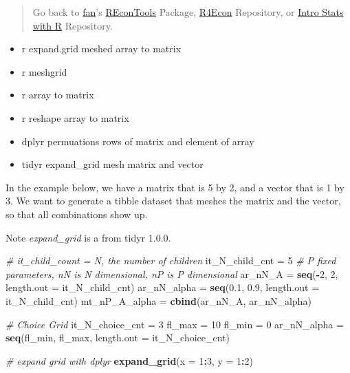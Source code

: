 \documentclass[
]{book}
\newenvironment{Shaded}{\begin{snugshade}}{\end{snugshade}}
\newcommand{\CommentTok}[1]{\textcolor[rgb]{0.56,0.35,0.01}{\textit{#1}}}
\newcommand{\DataTypeTok}[1]{\textcolor[rgb]{0.13,0.29,0.53}{#1}}
\newcommand{\DecValTok}[1]{\textcolor[rgb]{0.00,0.00,0.81}{#1}}
\newcommand{\FloatTok}[1]{\textcolor[rgb]{0.00,0.00,0.81}{#1}}
\newcommand{\KeywordTok}[1]{\textcolor[rgb]{0.13,0.29,0.53}{\textbf{#1}}}
\newcommand{\NormalTok}[1]{#1}
\newcommand{\OperatorTok}[1]{\textcolor[rgb]{0.81,0.36,0.00}{\textbf{#1}}}
\newcommand{\StringTok}[1]{\textcolor[rgb]{0.31,0.60,0.02}{#1}}
\providecommand{\tightlist}{%
  \setlength{\itemsep}{0pt}\setlength{\parskip}{0pt}}
\begin{document}
\begin{quote}
Go back to \href{http://fanwangecon.github.io/CodeDynaAsset/}{fan}'s \href{https://fanwangecon.github.io/REconTools/}{REconTools} Package, \href{https://fanwangecon.github.io/R4Econ/}{R4Econ} Repository, or \href{https://fanwangecon.github.io/Stat4Econ/}{Intro Stats with R} Repository.
\end{quote}

\begin{itemize}
\tightlist
\item
  r expand.grid meshed array to matrix
\item
  r meshgrid
\item
  r array to matrix
\item
  r reshape array to matrix
\item
  dplyr permuations rows of matrix and element of array
\item
  tidyr expand\_grid mesh matrix and vector
\end{itemize}

In the example below, we have a matrix that is 5 by 2, and a vector that is 1 by 3. We want to generate a tibble dataset that meshes the matrix and the vector, so that all combinations show up.

Note \emph{expand\_grid} is a from tidyr 1.0.0.

\begin{Shaded}
\begin{Highlighting}[]
\CommentTok{# it_child_count = N, the number of children}
\NormalTok{it_N_child_cnt =}\StringTok{ }\DecValTok{5}
\CommentTok{# P fixed parameters, nN is N dimensional, nP is P dimensional}
\NormalTok{ar_nN_A =}\StringTok{ }\KeywordTok{seq}\NormalTok{(}\OperatorTok{-}\DecValTok{2}\NormalTok{, }\DecValTok{2}\NormalTok{, }\DataTypeTok{length.out =}\NormalTok{ it_N_child_cnt)}
\NormalTok{ar_nN_alpha =}\StringTok{ }\KeywordTok{seq}\NormalTok{(}\FloatTok{0.1}\NormalTok{, }\FloatTok{0.9}\NormalTok{, }\DataTypeTok{length.out =}\NormalTok{ it_N_child_cnt)}
\NormalTok{mt_nP_A_alpha =}\StringTok{ }\KeywordTok{cbind}\NormalTok{(ar_nN_A, ar_nN_alpha)}

\CommentTok{# Choice Grid}
\NormalTok{it_N_choice_cnt =}\StringTok{ }\DecValTok{3}
\NormalTok{fl_max =}\StringTok{ }\DecValTok{10}
\NormalTok{fl_min =}\StringTok{ }\DecValTok{0}
\NormalTok{ar_nN_alpha =}\StringTok{ }\KeywordTok{seq}\NormalTok{(fl_min, fl_max, }\DataTypeTok{length.out =}\NormalTok{ it_N_choice_cnt)}

\CommentTok{# expand grid with dplyr}
\KeywordTok{expand_grid}\NormalTok{(}\DataTypeTok{x =} \DecValTok{1}\OperatorTok{:}\DecValTok{3}\NormalTok{, }\DataTypeTok{y =} \DecValTok{1}\OperatorTok{:}\DecValTok{2}\NormalTok{)}
\end{Highlighting}
\end{Shaded}
\end{document}
